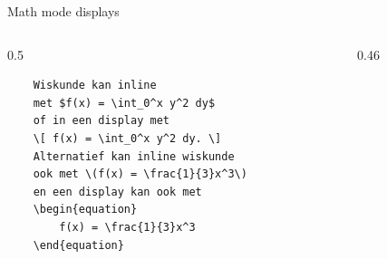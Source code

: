 \begin{frame}[fragile, t]{Math mode displays}
\begin{columns}[t]
    \begin{column}{0.5\textwidth}
    \begin{verbatim}
    Wiskunde kan inline 
    met $f(x) = \int_0^x y^2 dy$ 
    of in een display met 
    \[ f(x) = \int_0^x y^2 dy. \]
    Alternatief kan inline wiskunde 
    ook met \(f(x) = \frac{1}{3}x^3\) 
    en een display kan ook met 
    \begin{equation}
        f(x) = \frac{1}{3}x^3
    \end{equation}
    \end{verbatim}
    \par
\end{column}

\begin{column}{0.46\textwidth}
    \vspace{1mm}
\end{column}
\end{columns}

\end{frame}
